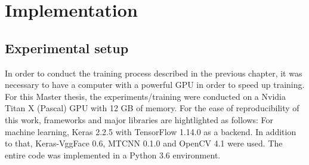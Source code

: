 \chapter{Implementation}
\section{Experimental setup}
In order to conduct the training process described in the previous chapter, it was necessary to have a computer with a powerful GPU in order to speed up training. For this Master thesis, the experiments/training were conducted on a Nvidia Titan X (Pascal) GPU with 12 GB of memory. 
\newline\newline
For the ease of reproducibility of this work, frameworks and major libraries are hightlighted as follows: For machine learning, Keras 2.2.5 with TensorFlow 1.14.0 as a backend. In addition to that, Keras-VggFace 0.6, MTCNN 0.1.0 and OpenCV 4.1 were used. The entire code was implemented in a Python 3.6 environment.



